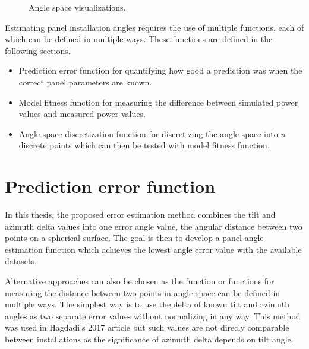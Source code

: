 \begin{figure}[h]
\begin{subfigure}[b]{0.35\textwidth}
         \label{fig_anglespace1}
     \end{subfigure}
     \hfill
     \caption{Angle space visualizations.}
     \label{fig_anglespace}
\end{figure}


\noindent Estimating panel installation angles requires the use of multiple functions, each of which can be defined in multiple ways. These functions are defined in the following sections.
\begin{itemize}
  \item Prediction error function for quantifying how good a prediction was when the correct panel parameters are known.
  \item Model fitness function for measuring the difference between simulated power values and measured power values.
  \item Angle space discretization function for discretizing the angle space into $n$ discrete points which can then be tested with model fitness function.
\end{itemize}




\section{Prediction error function}
In this thesis, the proposed error estimation method combines the tilt and azimuth delta values into one error angle value, the angular distance between two points on a spherical surface. The goal is then to develop a panel angle estimation function which achieves the lowest angle error value with the available datasets.

Alternative approaches can also be chosen as the function or functions for measuring the distance between two points in angle space can be defined in multiple ways. The simplest way is to use the delta of known tilt and azimuth angles as two separate error values without normalizing in any way. This method was used in Hagdadi's 2017\cite{navid_australian_article} article but such values are not direcly comparable between installations as the significance of azimuth delta depends on tilt angle.


